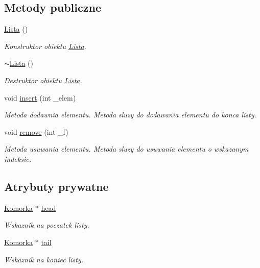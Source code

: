 \subsection*{Metody publiczne}
\begin{DoxyCompactItemize}
\item 
\hyperlink{class_lista_a1f668b36909182ef1360b48503529a31}{Lista} ()
\begin{DoxyCompactList}\small\item\em Konstruktor obiektu \hyperlink{class_lista}{Lista}. \end{DoxyCompactList}\item 
\hyperlink{class_lista_a4d7394b2728a00ad8404965b2e15d096}{$\sim$\-Lista} ()
\begin{DoxyCompactList}\small\item\em Destruktor obiektu \hyperlink{class_lista}{Lista}. \end{DoxyCompactList}\item 
void \hyperlink{class_lista_acec8ac807da644d8250c3c6043a208e1}{insert} (int \-\_\-elem)
\begin{DoxyCompactList}\small\item\em Metoda dodawnia elementu. Metoda sluzy do dodawania elementu do konca listy. \end{DoxyCompactList}\item 
void \hyperlink{class_lista_aa30ec43a5b51a0e37ffe8f098c5dcaa8}{remove} (int \-\_\-f)
\begin{DoxyCompactList}\small\item\em Metoda usuwania elementu. Metoda sluzy do usuwania elementu o wskazanym indeksie. \end{DoxyCompactList}\end{DoxyCompactItemize}
\subsection*{Atrybuty prywatne}
\begin{DoxyCompactItemize}
\item 
\hyperlink{struct_lista_1_1_komorka}{Komorka} $\ast$ \hyperlink{class_lista_aeba20505030183d334971bd44c3c8b95}{head}
\begin{DoxyCompactList}\small\item\em Wskaznik na poczatek listy. \end{DoxyCompactList}\item 
\hyperlink{struct_lista_1_1_komorka}{Komorka} $\ast$ \hyperlink{class_lista_a7d42e5f99e945d97c29d6f764f71f4e7}{tail}
\begin{DoxyCompactList}\small\item\em Wskaznik na koniec listy. \end{DoxyCompactList}\end{DoxyCompactItemize}


